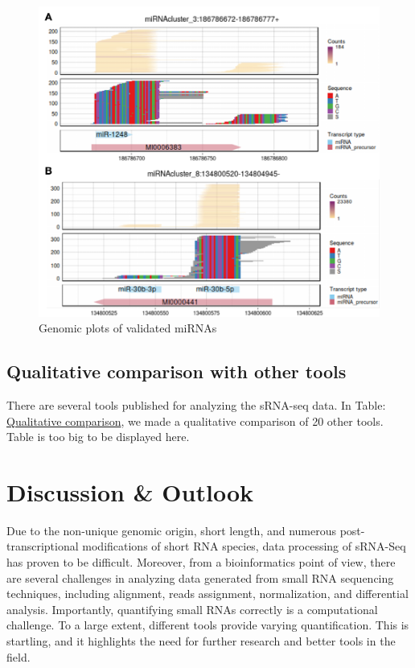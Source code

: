 \documentclass[12pt,twoside]{reedthesis}
\begin{document}
\begin{subfigures}
\begin{figure}[htbp]
{\centering \includegraphics{thesis_files/figure-latex/3f18b-1} 

}

\caption{Genomic plots of validated miRNAs}\label{fig:3f18b}
\end{figure}
\end{subfigures}
\hypertarget{qualitative-comparison-with-other-tools}{%
\subsection{Qualitative comparison with other tools}\label{qualitative-comparison-with-other-tools}}

There are several tools published for analyzing the sRNA-seq data. In
Table: \href{figures/shortRNA/in/t3.xlsx}{Qualitative comparison}, we made a qualitative comparison of 20 other tools. Table is too big to be displayed here.

\hypertarget{discussion-outlook}{%
\section{Discussion \& Outlook}\label{discussion-outlook}}

Due to the non-unique genomic origin, short length, and numerous
post-transcriptional modifications of short RNA species, data processing
of sRNA-Seq has proven to be difficult. Moreover, from a bioinformatics
point of view, there are several challenges in analyzing data generated
from small RNA sequencing techniques, including alignment, reads
assignment, normalization, and differential analysis. Importantly,
quantifying small RNAs correctly is a computational challenge. To a
large extent, different tools provide varying quantification. This is
startling, and it highlights the need for further research and better
tools in the field.
\end{document}
